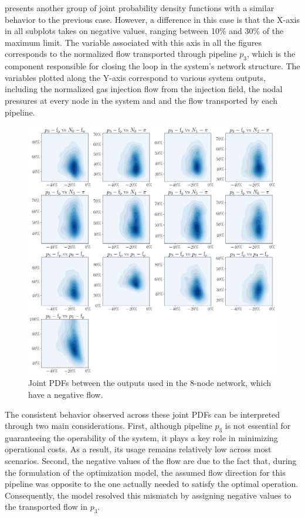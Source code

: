  presents another group of joint probability density functions with a similar behavior to the previous case. However, a difference in this case is that the X-axis in all subplots takes on negative values, ranging between 10\% and 30\% of the maximum limit. The variable associated with this axis in all the figures corresponds to the normalized flow transported through pipeline $p_3$, which is the component responsible for closing the loop in the system’s network structure. The variables plotted along the Y-axis correspond to various system outputs, including the normalized gas injection flow from the injection field, the nodal pressures at every node in the system and and the flow transported by each pipeline.

\begin{figure}[htbp]
    \begin{center}
        \includegraphics[width=.7\textwidth]{figures/Chapter_NonLinealCensnet/outputs_outputs_2.png}
    \end{center}
    \caption{Joint PDFs between the outputs used in the 8-node network, which have a negative flow.}
    \label{fig:joint_distributions_output_output_2}
\end{figure}


The consistent behavior observed across these joint PDFs can be interpreted through two main considerations. First, although pipeline $p_3$ is not essential for guaranteeing the operability of the system, it plays a key role in minimizing operational costs. As a result, its usage remains relatively low across most scenarios. Second, the negative values of the flow are due to the fact that, during the formulation of the optimization model, the assumed flow direction for this pipeline was opposite to the one actually needed to satisfy the optimal operation. Consequently, the model resolved this mismatch by assigning negative values to the transported flow in $p_3$.




